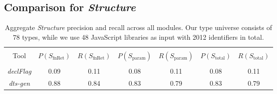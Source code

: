 \documentclass[sigplan,10pt,anonymous]{acmart} %
\theoremstyle{plain}
\theoremstyle{remark}
\theoremstyle{definition}
\begin{document}

\subsection{Comparison for \textit{Structure}} \label{ssec:structure_comparison}

\begin{table*}[t]
  \centering
  \caption{Aggregate \textit{Structure} precision and recall across all modules.
    Our type universe consists of $78$ types, while we use 48 JavaScript libraries as input with 2012 identifiers in total.} \label{tab:structprec}
  \begin{tabular}{ccccccc}
    \toprule                                                                                                                                              \\
    Tool              & $P(S_\text{fnRet})$ & $R(S_\text{fnRet})$ & $P(S_\text{param})$ & $R(S_\text{param})$ & $P(S_\text{total})$ & $R(S_\text{total})$ \\
    \midrule                                                                                                                                              \\
    \textit{declFlag} & 0.09                & 0.11                & 0.08                & 0.11                & 0.08                & 0.11                \\
    \textit{dts-gen}  & 0.88                & 0.84                & 0.83                & 0.79                & 0.83                & 0.79                \\
    \bottomrule
  \end{tabular}
\end{table*}
\end{document}
